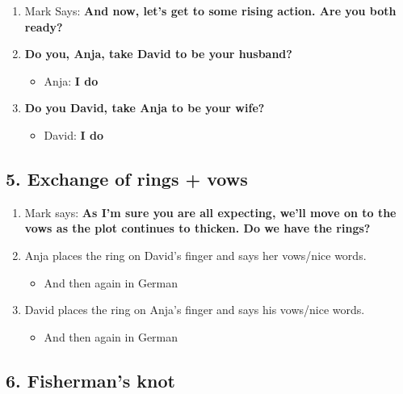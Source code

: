 \begin{enumerate}
\def\labelenumi{\arabic{enumi}.}
\tightlist
\item
  Mark Says: \textbf{And now, let's get to some rising action. Are you
  both ready?}
\item
  \textbf{Do you, Anja, take David to be your husband?}

  \begin{itemize}
  \tightlist
  \item
    Anja: \textbf{I do}
  \end{itemize}
\item
  \textbf{Do you David, take Anja to be your wife?}

  \begin{itemize}
  \tightlist
  \item
    David: \textbf{I do}
  \end{itemize}
\end{enumerate}

\hypertarget{exchange-of-rings-vows}{%
\subsection{5. Exchange of rings + vows}\label{exchange-of-rings-vows}}

\begin{enumerate}
\def\labelenumi{\arabic{enumi}.}
\tightlist
\item
  Mark says: \textbf{As I'm sure you are all expecting, we'll move on to
  the vows as the plot continues to thicken. Do we have the rings?}
\item
  Anja places the ring on David's finger and says her vows/nice words.

  \begin{itemize}
  \tightlist
  \item
    And then again in German
  \end{itemize}
\item
  David places the ring on Anja's finger and says his vows/nice words.

  \begin{itemize}
  \tightlist
  \item
    And then again in German
  \end{itemize}
\end{enumerate}

\hypertarget{fishermans-knot}{%
\subsection{6. Fisherman's knot}\label{fishermans-knot}}

